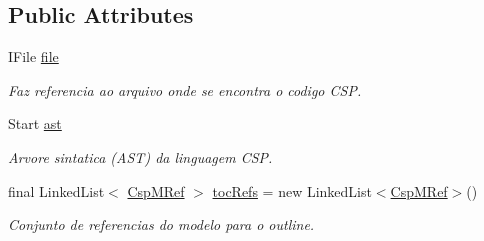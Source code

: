 \subsection*{Public Attributes}
\begin{DoxyCompactItemize}
\item 
\mbox{\label{classcom_1_1fware_1_1cspdt_1_1cspm_1_1core_1_1model_1_1_csp_m_model_ade0ba2ecf90a09b10dda2370389c41ef}} 
I\+File \hyperlink{classcom_1_1fware_1_1cspdt_1_1cspm_1_1core_1_1model_1_1_csp_m_model_ade0ba2ecf90a09b10dda2370389c41ef}{file}
\begin{DoxyCompactList}\small\item\em Faz referencia ao arquivo onde se encontra o codigo C\+SP. \end{DoxyCompactList}\item 
\mbox{\label{classcom_1_1fware_1_1cspdt_1_1cspm_1_1core_1_1model_1_1_csp_m_model_a542b3eb8b7b6ac41151f05c512e7be55}} 
Start \hyperlink{classcom_1_1fware_1_1cspdt_1_1cspm_1_1core_1_1model_1_1_csp_m_model_a542b3eb8b7b6ac41151f05c512e7be55}{ast}
\begin{DoxyCompactList}\small\item\em Arvore sintatica (A\+ST) da linguagem C\+SP. \end{DoxyCompactList}\item 
\mbox{\label{classcom_1_1fware_1_1cspdt_1_1cspm_1_1core_1_1model_1_1_csp_m_model_a1ed92caf2e91df005219ad24bce038a5}} 
final Linked\+List$<$ \hyperlink{classcom_1_1fware_1_1cspdt_1_1cspm_1_1core_1_1model_1_1_csp_m_ref}{Csp\+M\+Ref} $>$ \hyperlink{classcom_1_1fware_1_1cspdt_1_1cspm_1_1core_1_1model_1_1_csp_m_model_a1ed92caf2e91df005219ad24bce038a5}{toc\+Refs} = new Linked\+List$<$\hyperlink{classcom_1_1fware_1_1cspdt_1_1cspm_1_1core_1_1model_1_1_csp_m_ref}{Csp\+M\+Ref}$>$()
\begin{DoxyCompactList}\small\item\em Conjunto de referencias do modelo para o outline. \end{DoxyCompactList}\item 
\mbox{\label{classcom_1_1fware_1_1cspdt_1_1cspm_1_1core_1_1model_1_1_csp_m_model_a2c0b1dcabb33ffd380f10fb11306dd82}} 

\end{DoxyCompactItemize}
